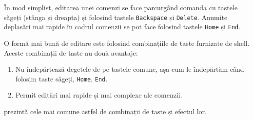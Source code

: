 În mod simplist, editarea unei comenzi se face parcurgând comanda cu tastele
săgeți (stânga și dreapta) și folosind tastele \texttt{Backspace} și \texttt{Delete}. Anumite
deplasări mai rapide în cadrul comenzii se pot face folosind tastele \texttt{Home} și
\texttt{End}.

O formă mai bună de editare este folosind combinațiile de taste furnizate de
shell. Aceste combinații de taste au două avantaje:

\begin{enumerate}
	\item Nu îndepărtează degetele de pe tastele comune, așa cum le
          îndepărtăm când folosim taste săgeți, \texttt{Home}, \texttt{End}.
	\item Permit editări mai rapide și mai complexe ale comenzii.
\end{enumerate}

 prezintă cele mai comune astfel de combinații de taste și efectul lor.

